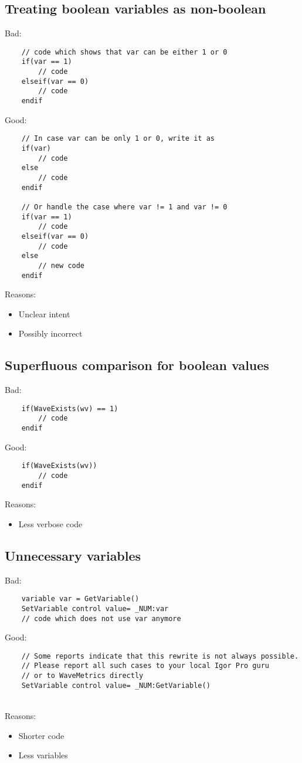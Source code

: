 \documentclass{scrartcl}
\begin{document}
\subsection{Treating boolean variables as non-boolean}
Bad:
\begin{verbatim}
	// code which shows that var can be either 1 or 0
	if(var == 1)
		// code
	elseif(var == 0)
		// code
	endif
\end{verbatim}
Good:
\begin{verbatim}
	// In case var can be only 1 or 0, write it as
	if(var)
		// code 
	else
		// code 
	endif

	// Or handle the case where var != 1 and var != 0
	if(var == 1)
		// code 
	elseif(var == 0)
		// code 
	else
		// new code
	endif
\end{verbatim}
Reasons: 
\begin{itemize}
	\item Unclear intent
	\item Possibly incorrect
\end{itemize}
% 
\subsection{Superfluous comparison for boolean values}
Bad:
\begin{verbatim}
	if(WaveExists(wv) == 1)
		// code
	endif
\end{verbatim}
Good:
\begin{verbatim}
	if(WaveExists(wv))
		// code
	endif
\end{verbatim}
Reasons:
\begin{itemize}
  \item Less verbose code
\end{itemize}
% 
\subsection{Unnecessary variables}
Bad:
\begin{verbatim}
	variable var = GetVariable()
	SetVariable control value= _NUM:var
	// code which does not use var anymore
\end{verbatim}
\begin{minipage}{\textwidth}
Good:
\begin{verbatim}
	// Some reports indicate that this rewrite is not always possible.
	// Please report all such cases to your local Igor Pro guru
	// or to WaveMetrics directly
	SetVariable control value= _NUM:GetVariable()
\end{verbatim}
\end{minipage}\\[3ex]
Reasons:
\begin{itemize}
  \item Shorter code
  \item Less variables
\end{itemize}
% 
\end{document}
